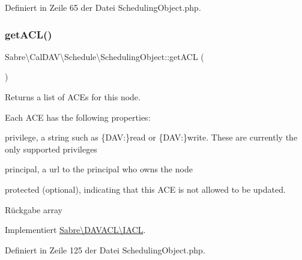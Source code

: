 Definiert in Zeile 65 der Datei Scheduling\+Object.\+php.

\mbox{\label{class_sabre_1_1_cal_d_a_v_1_1_schedule_1_1_scheduling_object_a4ceae3dda6c56e995dc4a0a973446389}} 
\subsubsection{\texorpdfstring{get\+A\+C\+L()}{getACL()}}
{\footnotesize\ttfamily Sabre\textbackslash{}\+Cal\+D\+A\+V\textbackslash{}\+Schedule\textbackslash{}\+Scheduling\+Object\+::get\+A\+CL (\begin{DoxyParamCaption}{ }\end{DoxyParamCaption})}

Returns a list of A\+CE\textquotesingle{}s for this node.

Each A\+CE has the following properties\+:
\begin{DoxyItemize}
\item \textquotesingle{}privilege\textquotesingle{}, a string such as \{D\+AV\+:\}read or \{D\+AV\+:\}write. These are currently the only supported privileges
\item \textquotesingle{}principal\textquotesingle{}, a url to the principal who owns the node
\item \textquotesingle{}protected\textquotesingle{} (optional), indicating that this A\+CE is not allowed to be updated.
\end{DoxyItemize}

\begin{DoxyReturn}{Rückgabe}
array 
\end{DoxyReturn}


Implementiert \mbox{\hyperlink{interface_sabre_1_1_d_a_v_a_c_l_1_1_i_a_c_l_a8fe3b3a5b48eae789d7eb722b340045c}{Sabre\textbackslash{}\+D\+A\+V\+A\+C\+L\textbackslash{}\+I\+A\+CL}}.



Definiert in Zeile 125 der Datei Scheduling\+Object.\+php.

\mbox{\label{class_sabre_1_1_cal_d_a_v_1_1_schedule_1_1_scheduling_object_a0273452750e1669a154a6f98a7b93132}} 
